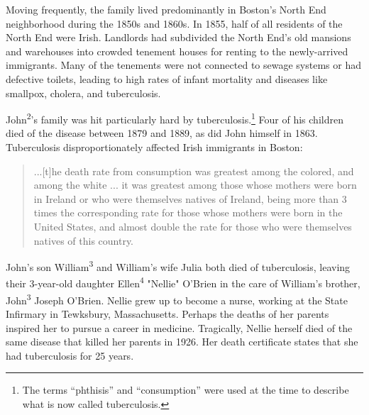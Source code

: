 Moving frequently, the family lived predominantly in Boston's North End neighborhood during the 1850s and 1860s.\cite{NorthEndAddresses} In 1855, half of all residents of the North End were Irish.\cite{Todisco:29} Landlords had subdivided the North End's old mansions and warehouses into crowded tenement houses for renting to the newly-arrived immigrants.\cite{Goldfeld:102} Many of the tenements were not connected to sewage systems or had defective toilets, leading to high rates of infant mortality and diseases like smallpox, cholera, and tuberculosis.\cite{Goldfeld:103,Todisco:21,Ryan:48}

John\textsuperscript{2}'s family was hit particularly hard by tuberculosis.\footnote{The terms ``phthisis'' and ``consumption'' were used at the time to describe what is now called tuberculosis.\cite{TuberculosisHistory}} Four of his children died of the disease between 1879 and 1889, as did John himself in 1863.\cite{John2OBrienDeath} Tuberculosis disproportionately affected Irish immigrants in Boston:

\begin{quote}
	...[t]he death rate from consumption was greatest among the colored, and among the white ... it was greatest among those whose mothers were born in Ireland or who were themselves natives of Ireland, being more than 3 times the corresponding rate for those whose mothers were born in the United States, and almost double the rate for those who were themselves natives of this country.\cite{VitalStatistics}
\end{quote}

John's son William\textsuperscript{3} and William's wife Julia both died of tuberculosis,\cite{William3OBrienDeath,JuliaMcCartyDeath} leaving their 3-year-old daughter Ellen\textsuperscript{4} "Nellie" O'Brien in the care of William's brother, John\textsuperscript{3} Joseph O'Brien.\cite{WilliamOBrienWill} Nellie grew up to become a nurse, working at the State Infirmary in Tewksbury, Massachusetts.\cite{Ellen4OBrien1919,Census1920EllenOBrien} Perhaps the deaths of her parents inspired her to pursue a career in medicine. Tragically, Nellie herself died of the same disease that killed her parents in 1926. Her death certificate states that she had tuberculosis for 25 years.\cite{Ellen4OBrienDeath2}


